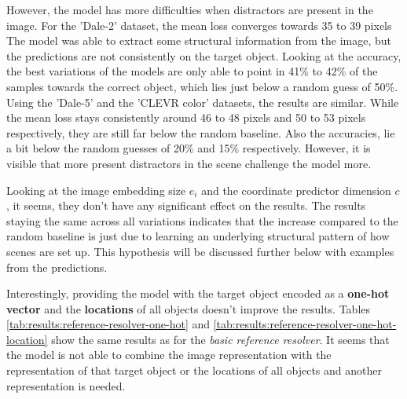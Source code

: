 However, the model has more difficulties when distractors are present in the image.
For the 'Dale-2' dataset, the mean loss converges towards 35 to 39 pixels
The model was able to extract some structural information from the image, but the predictions are not consistently on the target object.
Looking at the accuracy, the best variations of the models are only able to point in 41\% to 42\% of the samples towards the correct object, which lies just below a random guess of 50\%.
Using the 'Dale-5' and the 'CLEVR color' datasets, the results are similar.
While the mean loss stays consistently around 46 to 48 pixels and 50 to 53 pixels respectively, they are still far below the random baseline.
Also the accuracies, lie a bit below the random guesses of 20\% and 15\% respectively.
However, it is visible that more present distractors in the scene challenge the model more.

Looking at the image embedding size $e_i$ and the coordinate predictor dimension $c$, it seems, they don't have any significant effect on the results.
The results staying the same across all variations indicates that the increase compared to the random baseline is just due to learning an underlying structural pattern of how scenes are set up.
This hypothesis will be discussed further below with examples from the predictions.

Interestingly, providing the model with the target object encoded as a \textbf{one-hot vector} and the \textbf{locations} of all objects doesn't improve the results.
Tables \ref{tab:results:reference-resolver-one-hot} and \ref{tab:results:reference-resolver-one-hot-location} show the same results as for the \emph{basic reference resolver}.
It seems that the model is not able to combine the image representation with the representation of that target object or the locations of all objects and another representation is needed.

